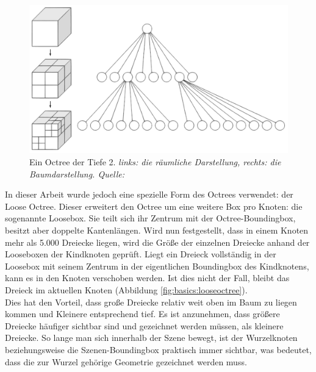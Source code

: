 \begin{figure}
 \centering
  \includegraphics[scale=0.5]{images/octree.pdf}
  \caption{Ein Octree der Tiefe 2. \textit{links: die räumliche Darstellung, rechts: die Baumdarstellung. Quelle: \cite{wikioctree}}}
 \label{fig:basics:octree}
\end{figure}
In dieser Arbeit wurde jedoch eine spezielle Form des Octrees verwendet: der Loose Octree. Dieser erweitert den Octree um eine weitere Box pro Knoten: die sogenannte Loosebox. Sie teilt sich ihr Zentrum mit der Octree-Boundingbox, besitzt aber doppelte Kantenlängen. Wird nun festgestellt, dass in einem Knoten mehr als 5.000 Dreiecke liegen, wird die Größe der einzelnen Dreiecke anhand der Looseboxen der Kindknoten geprüft. Liegt ein Dreieck vollständig in der Loosebox mit seinem Zentrum in der eigentlichen Boundingbox des Kindknotens, kann es in den Knoten verschoben werden. Ist dies nicht der Fall, bleibt das Dreieck im aktuellen Knoten (Abbildung \ref{fig:basics:looseoctree}).\\
Dies hat den Vorteil, dass große Dreiecke relativ weit oben im Baum zu liegen kommen und Kleinere entsprechend tief. Es ist anzunehmen, dass größere Dreiecke häufiger sichtbar sind und gezeichnet werden müssen, als kleinere Dreiecke. So lange man sich innerhalb der Szene bewegt, ist der Wurzelknoten beziehungsweise die Szenen-Boundingbox praktisch immer sichtbar, was bedeutet, dass die zur Wurzel gehörige Geometrie gezeichnet werden muss.
